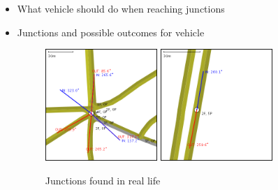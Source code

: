 \begin{itemize}
    \item What vehicle should do when reaching junctions
    \item Junctions and possible outcomes for vehicle
        \begin{figure}[h]
            \caption{Junctions found in real life}
            \label{fig:junctionTypes}
            \centering
            \includegraphics[width=0.4\textwidth]{figs/junction/junction_5_roads.png}
            \hspace{0.2em}
            \includegraphics[width=0.4\textwidth]{figs/junction/junction_two_roads.png}
        \end{figure}


\end{itemize}
